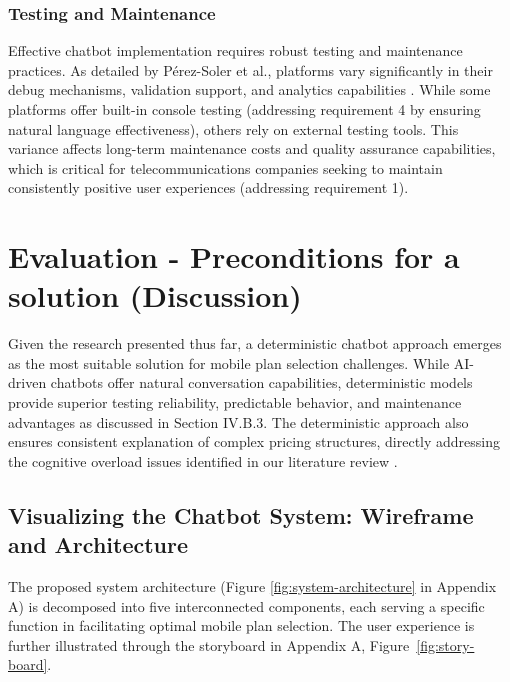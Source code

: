 \documentclass[conference]{IEEEtran}
\begin{document}
\subsubsection{Testing and Maintenance}
Effective chatbot implementation requires robust testing and maintenance practices. As detailed by Pérez-Soler et al., platforms vary significantly in their debug mechanisms, validation support, and analytics capabilities \cite{b11}. While some platforms offer built-in console testing (addressing requirement 4 by ensuring natural language effectiveness), others rely on external testing tools. This variance affects long-term maintenance costs and quality assurance capabilities, which is critical for telecommunications companies seeking to maintain consistently positive user experiences (addressing requirement 1).
\section{Evaluation - Preconditions for a solution (Discussion)}
Given the research presented thus far, a deterministic chatbot approach emerges as the most suitable solution for mobile plan selection challenges. While AI-driven chatbots offer natural conversation capabilities, deterministic models provide superior testing reliability, predictable behavior, and maintenance advantages as discussed in Section IV.B.3. The deterministic approach also ensures consistent explanation of complex pricing structures, directly addressing the cognitive overload issues identified in our literature review \cite{b1, b3}.

\subsection{Visualizing the Chatbot System: Wireframe and Architecture}
The proposed system architecture (Figure \ref{fig:system-architecture} in Appendix A) is decomposed into five interconnected components, each serving a specific function in facilitating optimal mobile plan selection. The user experience is further illustrated through the storyboard in Appendix A, Figure~\ref{fig:story-board}.
\end{document}
